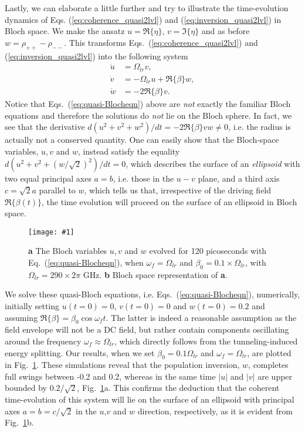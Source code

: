 \documentclass[onecolumn,secnumarabic,amssymb, nobibnotes, aip, prd]{revtex4-1}
\newcommand{\includegraphicsXL}[1]{\texttt{[image: \#1]}}
\begin{document}
Lastly, we can elaborate a little further and try to illustrate the time-evolution dynamics of Eqs. (\ref{eq:coherence_quasi2lvl}) and (\ref{eq:inversion_quasi2lvl}) in Bloch space. We make the ansatz $u=\Re\{\eta\}$, $v =\Im\{\eta\}$ and as before $w = \rho_{++}-\rho_{--}$. This transforms Eqs.~(\ref{eq:coherence_quasi2lvl}) and (\ref{eq:inversion_quasi2lvl}) into the following system 
\begin{subequations}
	\label{eq:quasi-Blocheqn}
	\begin{align}
	\dot{u} &= \Omega_{lr} v , \\
	\dot{v} &= -\Omega_{lr} u +\Re\{\beta\} w , \\
	\dot{w} &= -2\Re\{\beta\} v.
	\end{align}
\end{subequations}
Notice that Eqs.~(\ref{eq:quasi-Blocheqn}) above are \emph{not} exactly the familiar Bloch equations and therefore the solutions do \emph{not} lie on the Bloch sphere. In fact, we see that the derivative $d(u^2+v^2+w^2)/dt = -2\Re\{\beta\} vw \neq 0$, i.e. the radius is actually not a conserved quantity. One can easily show that the Bloch-space variables, $u,v $ and $w$, instead satisfy the equality $d(u^2+v^2+(w/\sqrt{2})^2)/dt = 0$, which describes the surface of an \emph{ellipsoid} with two equal principal axes $a=b$, i.e. those in the $u-v$ plane, and a third axis $c = \sqrt{2}a$ parallel to $w$, which tells us that, irrespective of the driving field $\Re\{\beta(t)\}$, the time evolution will proceed on the surface of an ellipsoid in Bloch space.

\begin{figure}[h!]
	\begin{center}
		\includegraphicsXL{IMGS/quasi-bloch-resonance-new2.eps}
		\caption{\textbf{a} The Bloch variables $u,v$ and $w$ evolved for 120 picoseconds with Eq.~(\ref{eq:quasi-Blocheqn}), when $\omega_f = \Omega_{lr}$ and $\beta_0 = 0.1\times\Omega_{lr}$, with $\Omega_{lr} = 290\times 2\pi$ GHz. \textbf{b} Bloch space representation of \textbf{a}.} \label{fig:quasi-bloch-resonance}
	\end{center}	
\end{figure}
We solve these quasi-Bloch equations, i.e. Eqs.~(\ref{eq:quasi-Blocheqn}), numerically, initially setting $u(t=0)=0$, $v(t=0) = 0$ and $w(t=0) = 0.2$ and assuming $\Re\{\beta\} = \beta_0 \cos\omega_f t$. The latter is indeed a reasonable assumption as the field envelope will not be a DC field, but rather contain components oscillating around the frequency $\omega_f \approx \Omega_{lr}$, which directly follows from the tunneling-induced energy splitting. Our results, when we set $\beta_0 = 0.1\Omega_{lr}$ and $\omega_f = \Omega_{lr}$, are plotted in Fig.~\ref{fig:quasi-bloch-resonance}. These simulations reveal that the population inversion, $w$, completes full swings between -0.2 and 0.2, whereas in the same time $|u|$ and $|v|$ are upper bounded by $0.2/\sqrt{2}$, Fig.~\ref{fig:quasi-bloch-resonance}a. This confirms the deduction that the coherent time-evolution of this system will lie on the surface of an ellipsoid with principal axes $a=b=c/\sqrt{2}$ in the $u$,$v$ and $w$ direction, respectively, as it is evident from Fig.~\ref{fig:quasi-bloch-resonance}b. 
\end{document}
